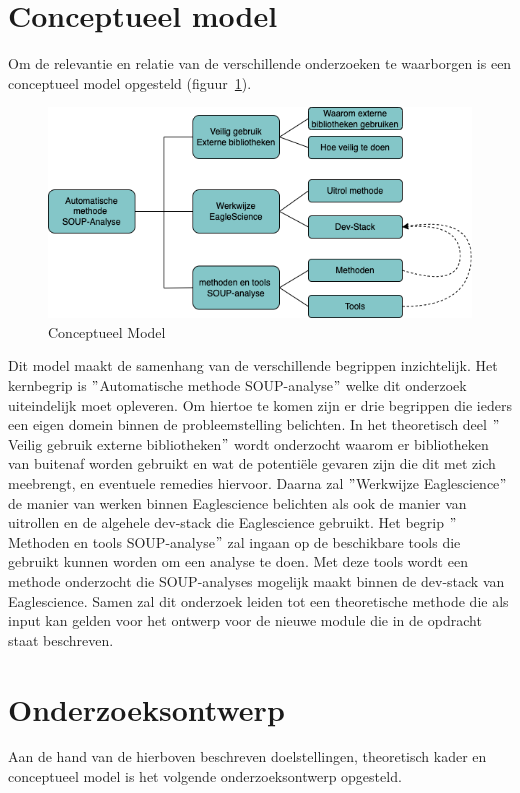 \section{Conceptueel model}\label{sec:conceptueel-model}
Om de relevantie en relatie van de verschillende onderzoeken te waarborgen is een conceptueel model opgesteld (figuur~\ref{fig:ConceptueelModel}).
\begin{figure}
    \centering
    \includegraphics[width=12cm]{gfx/Conceptueel Model}
    \caption{Conceptueel Model}
    \label{fig:ConceptueelModel}
\end{figure}
Dit model maakt de samenhang van de verschillende begrippen inzichtelijk. Het kernbegrip is $"$Automatische methode SOUP-analyse$"$ welke dit onderzoek uiteindelijk moet opleveren. Om hiertoe te komen zijn er drie begrippen die ieders een eigen domein binnen de probleemstelling belichten. In het theoretisch deel $"$Veilig gebruik externe bibliotheken$"$  wordt onderzocht waarom er bibliotheken van buitenaf worden gebruikt en wat de potentiële gevaren zijn die dit met zich meebrengt, en eventuele remedies hiervoor. Daarna zal $"$Werkwijze Eaglescience$"$ de manier van werken binnen Eaglescience belichten als ook de manier van uitrollen en de algehele dev-stack die Eaglescience gebruikt. Het begrip $"$Methoden en tools SOUP-analyse$"$ zal ingaan op de beschikbare tools die gebruikt kunnen worden om een analyse te doen. Met deze tools wordt een methode onderzocht die SOUP-analyses mogelijk maakt binnen de dev-stack van Eaglescience. Samen zal dit onderzoek leiden tot een theoretische methode die als input kan gelden voor het ontwerp voor de nieuwe module die in de opdracht staat beschreven.

\section{Onderzoeksontwerp}\label{sec:OP_onderzoeksontwerp}
Aan de hand van de hierboven beschreven doelstellingen, theoretisch kader en conceptueel model is het volgende onderzoeksontwerp opgesteld.

